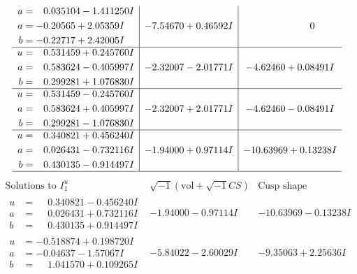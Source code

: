 \documentclass[1p]{elsarticle_modified}
\theoremstyle{definition}
\newcommand{\I}{\sqrt{-1}}
\begin{document}
$$\begin{array}{c|c|c}
\begin{aligned}
u &= \phantom{-}0.035104 - 1.411250 I \\
a &= -0.20565 + 2.05359 I \\
b &= -0.22717 + 2.42005 I\end{aligned}
 & -7.54670 + 0.46592 I & \phantom{-0.000000 } 0 \\ \hline\begin{aligned}
u &= \phantom{-}0.531459 + 0.245760 I \\
a &= \phantom{-}0.583624 - 0.405997 I \\
b &= \phantom{-}0.299281 + 1.076830 I\end{aligned}
 & -2.32007 - 2.01771 I & -4.62460 + 0.08491 I \\ \hline\begin{aligned}
u &= \phantom{-}0.531459 - 0.245760 I \\
a &= \phantom{-}0.583624 + 0.405997 I \\
b &= \phantom{-}0.299281 - 1.076830 I\end{aligned}
 & -2.32007 + 2.01771 I & -4.62460 - 0.08491 I \\ \hline\begin{aligned}
u &= \phantom{-}0.340821 + 0.456240 I \\
a &= \phantom{-}0.026431 - 0.732116 I \\
b &= \phantom{-}0.430135 - 0.914497 I\end{aligned}
 & -1.94000 + 0.97114 I & -10.63969 + 0.13238 I\\
 \hline 
 \end{array}$$\newpage$$\begin{array}{c|c|c}  
\text{Solutions to }I^u_{1}& \I (\text{vol} + \sqrt{-1}CS) & \text{Cusp shape}\\
 \hline 
\begin{aligned}
u &= \phantom{-}0.340821 - 0.456240 I \\
a &= \phantom{-}0.026431 + 0.732116 I \\
b &= \phantom{-}0.430135 + 0.914497 I\end{aligned}
 & -1.94000 - 0.97114 I & -10.63969 - 0.13238 I \\ \hline\begin{aligned}
u &= -0.518874 + 0.198720 I \\
a &= -0.04637 - 1.57067 I \\
b &= \phantom{-}1.041570 + 0.109265 I\end{aligned}
 & -5.84022 - 2.60029 I & -9.35063 + 2.25636 I \\ \hline\begin{aligned}

\end{aligned}
\end{array}$$
\end{document}
